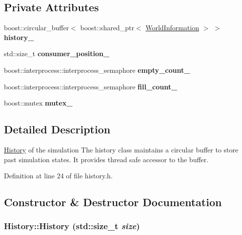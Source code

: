 \subsection*{Private Attributes}
\begin{CompactItemize}
\item 
\hypertarget{class_history_650374a2e1175423c867a77bd0d31075}{
boost::circular\_\-buffer$<$ boost::shared\_\-ptr$<$ \hyperlink{class_world_information}{WorldInformation} $>$ $>$ \textbf{history\_\-}}
\label{class_history_650374a2e1175423c867a77bd0d31075}

\item 
\hypertarget{class_history_323b31291bbed2a143bc4ba2c6607a4c}{
std::size\_\-t \textbf{consumer\_\-position\_\-}}
\label{class_history_323b31291bbed2a143bc4ba2c6607a4c}

\item 
\hypertarget{class_history_14eb7399599a276b8943137e0173e1bc}{
boost::interprocess::interprocess\_\-semaphore \textbf{empty\_\-count\_\-}}
\label{class_history_14eb7399599a276b8943137e0173e1bc}

\item 
\hypertarget{class_history_128179c2c8bd17ccbf429bda72b08d8d}{
boost::interprocess::interprocess\_\-semaphore \textbf{fill\_\-count\_\-}}
\label{class_history_128179c2c8bd17ccbf429bda72b08d8d}

\item 
\hypertarget{class_history_8030f931d185354ebf5576789625e404}{
boost::mutex \textbf{mutex\_\-}}
\label{class_history_8030f931d185354ebf5576789625e404}

\end{CompactItemize}


\subsection{Detailed Description}
\hyperlink{class_history}{History} of the simulation The history class maintains a circular buffer to store past simulation states. It provides thread safe accessor to the buffer. 

Definition at line 24 of file history.h.

\subsection{Constructor \& Destructor Documentation}
\hypertarget{class_history_29c644a10ab5e5f533b7e0dad3282550}{
\subsubsection[History]{\setlength{\rightskip}{0pt plus 5cm}History::History (std::size\_\-t {\em size})}}
\label{class_history_29c644a10ab5e5f533b7e0dad3282550}



